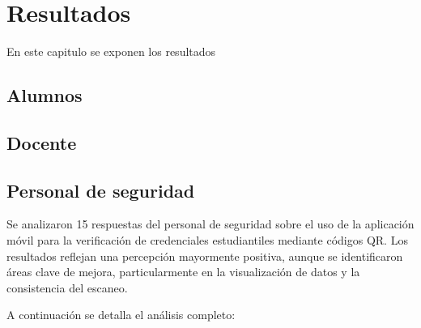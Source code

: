 \chapter{Resultados}

En este capitulo se exponen los resultados

\section{Alumnos}
\section{Docente}
\section{Personal de seguridad}
Se analizaron 15 respuestas del personal de seguridad sobre el uso de la aplicación móvil para la verificación de credenciales estudiantiles mediante códigos QR. Los resultados reflejan una percepción mayormente positiva, aunque se identificaron áreas clave de mejora, particularmente en la visualización de datos y la consistencia del escaneo.

A continuación se detalla el análisis completo:
